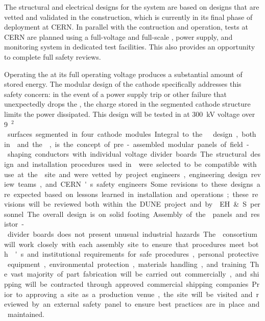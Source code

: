 
The structural and electrical designs for the   system are based on designs that are vetted and validated in the  construction, which is currently in its final phase of deployment at CERN. In parallel with the  contruction and operation,   tests at CERN are planned using %
a full-voltage and full-scale  \fdth, power supply, and monitoring system in dedicated  test facilities. This also provides an opportunity %
to complete full safety reviews. 

Operating the  at its full operating voltage produces a substantial amount of stored energy. The modular design of the cathode specifically addresses this safety concern: in the event of a power supply trip or other failure that unexpectedly drops the , the charge stored in the segmented cathode structure limits the power dissipated. 
This design will be tested in  at \SI{300}{kV} voltage over \SI{9}{\m$^2$} surfaces segmented in four cathode modules.  

Integral to the   design, both in  and the \dpmod, is the concept of pre-assembled modular panels of field-shaping conductors with individual voltage divider boards. The structural design and installation procedures used in  were selected to be compatible with use at the  site and were vetted by project engineers, engineering design review teams, and CERN's safety engineers. Some revisions to these designs are expected based on lessons learned in installation and operations; these revisions will be reviewed both within the DUNE project and by \fnal EH\&S personnel. The overall design is on solid footing. 

Assembly of the  panels and resistor-divider boards does not present unusual industrial hazards. 
The  consortium will work closely with each assembly site to ensure that procedures meet both \fnal{}'s and institutional requirements for safe procedures, personal protective equipment, environmental protection, %
materials handling, and training. The vast majority of %
part fabrication will be carried out commercially, and shipping will be contracted through approved commercial shipping companies. Prior to approving a site as a production venue, the site will be visited and reviewed by an external safety panel to ensure best practices are in place and maintained. 

